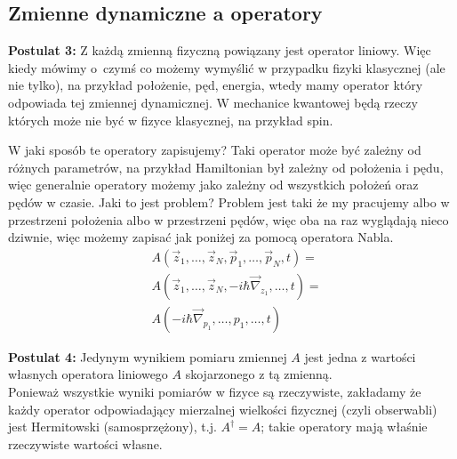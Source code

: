 \subsection{Zmienne dynamiczne a operatory}
\textbf{Postulat 3:} Z każdą zmienną fizyczną powiązany jest operator liniowy. 
Więc kiedy mówimy o~czymś co możemy wymyślić w przypadku fizyki klasycznej (ale nie tylko), na przykład położenie, pęd, energia, wtedy mamy operator który odpowiada tej zmiennej dynamicznej. W mechanice kwantowej będą rzeczy których może nie być w fizyce klasycznej, na przykład spin. 
\iffalse %
Co to znaczy że operator jest liniowy? Operator taki musi spełniać poniższe
\begin{equation*}
	A(c_1 \psi_1 + c_2 \psi_2) = c_1 A(\psi_1) + c_2 A(\psi_2)
\end{equation*}
\fi
W jaki sposób te operatory zapisujemy? Taki operator może być zależny od różnych parametrów, na przykład Hamiltonian był zależny od położenia i pędu, więc generalnie operatory możemy jako zależny od wszystkich położeń oraz pędów w czasie. Jaki to jest problem? Problem jest taki że my pracujemy albo w przestrzeni położenia albo w przestrzeni pędów, więc oba na raz wyglądają nieco dziwnie, więc możemy zapisać jak poniżej za pomocą operatora Nabla.
\begin{equation*}
	\begin{split}
		&A(\vec{z}_1, \dots, \vec{z}_N, \vec{p}_1, \dots, \vec{p}_N, t) = \\
		&A(\vec{z}_1, \dots, \vec{z}_N, -i \hbar \vec{\nabla}_{z_1}, \dots, t) = \\
		&A(-i \hbar \vec{\nabla}_{p_1}, \dots, p_1, \dots, t)
	\end{split}	
\end{equation*}

\iffalse %
\textbf{Definicja:} ${a_n \psi}_n$ to jest zbiór wartości własnych a również stanów operatora A $\iff$ $A \psi_n = a_n \psi_n$.
\fi

\textbf{Postulat 4:} Jedynym wynikiem pomiaru zmiennej $A$ jest jedna
z wartości własnych operatora liniowego $A$ skojarzonego z tą zmienną. \\
Ponieważ wszystkie wyniki pomiarów w fizyce są rzeczywiste, zakładamy
że każdy operator odpowiadający mierzalnej wielkości fizycznej
(czyli obserwabli) jest Hermitowski (samosprzężony), t.j. $A^\dagger = A$;
takie operatory mają właśnie rzeczywiste wartości własne.

